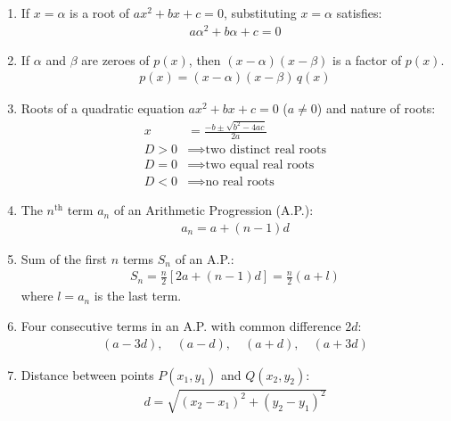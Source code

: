\begin{enumerate}[label=\thesubsection.\arabic*, ref=\thesubsection.\theenumi]
    
    \item If $x = \alpha$ is a root of $ax^2 + bx + c = 0$, substituting $x = \alpha$ satisfies:
\begin{align}
    a\alpha^2 + b\alpha + c = 0 \label{eq:EE26BTECH11225-root}
\end{align}

    \item If $\alpha$ and $\beta$ are zeroes of $p(x)$, then $(x - \alpha)(x - \beta)$ is a factor of $p(x)$.
\begin{align}
    p(x) = (x - \alpha)(x - \beta)\,q(x) \label{eq:EE26BTECH11225-factor}
\end{align}

    \item Roots of a quadratic equation $ax^2 + bx + c = 0$ ($a \neq 0$) and nature of roots:
\begin{align}
    x &= \frac{-b \pm \sqrt{b^2 - 4ac}}{2a} \label{eq:EE26BTECH11225-quadratic} \\
    D > 0 &\implies \text{two distinct real roots} \nonumber \\
    D = 0 &\implies \text{two equal real roots} \nonumber \\
    D < 0 &\implies \text{no real roots} \nonumber
\end{align}

    \item The $n^{\text{th}}$ term $a_n$ of an Arithmetic Progression (A.P.):
\begin{align}
    a_n = a + (n - 1)d \label{eq:EE26BTECH11225-ap-nth}
\end{align}

    \item Sum of the first $n$ terms $S_n$ of an A.P.:
\begin{align}
    S_n = \frac{n}{2}[2a + (n - 1)d] = \frac{n}{2}(a + l) \label{eq:EE26BTECH11225-ap-sum}
\end{align}
where $l = a_n$ is the last term.

    \item Four consecutive terms in an A.P. with common difference $2d$:
\begin{align}
    (a - 3d), \quad (a - d), \quad (a + d), \quad (a + 3d) \label{eq:EE26BTECH11225-ap-four}
\end{align}

    \item Distance between points $P(x_1, y_1)$ and $Q(x_2, y_2)$:
\begin{align}
    d = \sqrt{(x_2 - x_1)^2 + (y_2 - y_1)^2} \label{eq:EE26BTECH11225-distance}
\end{align}


\end{enumerate}
